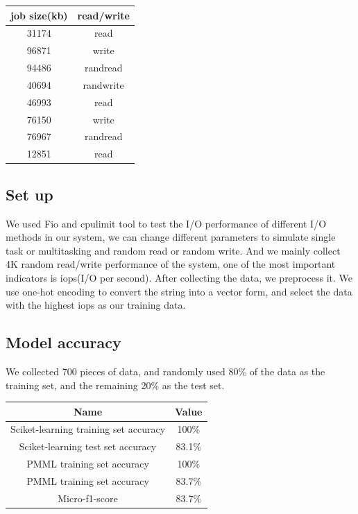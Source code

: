 \documentclass[conference]{IEEEtran}
\begin{document}
\begin{center}
	\begin{tabular}{cc}
\hline
job size(kb) & read/write\\
\hline
31174 & read      \\
96871 & write      \\
94486 & randread\\
40694 & randwrite \\
46993 & read       \\
76150 & write\\
76967 & randread  \\
12851 & read      \\

\hline
\end{tabular}
\end{center}

	\subsection{Set up}
	 We used Fio and cpulimit tool to test the I/O performance of different I/O methods in our system,
	 we can change different parameters to simulate single task or multitasking and random read or random write.
	 And we mainly collect 4K random read/write performance of the system, one of the most important indicators is iops(I/O per second).
	 After collecting the data, we preprocess it. We use one-hot encoding to convert the string into a vector form, and select the data with the highest iops as our training data.


\subsection{Model accuracy}

	We collected 700 pieces of data, and randomly used 80\% of the data as the training set, and the remaining 20\% as the test set.

\begin{center}
	\begin{tabular}{cc}
\hline
Name & Value \\
\hline
Sciket-learning training set accuracy & 100\%\\
Sciket-learning test set accuracy & 83.1\%\\
PMML training set accuracy & 100\%\\
PMML training set accuracy & 83.7\%\\
Micro-f1-score & 83.7\%\\
\hline
\end{tabular}
\end{center}
\end{document}

